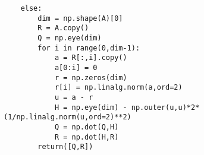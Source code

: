 \documentclass[10pt,a4paper]{article}
\begin{document}
\begin{verbatim}
    else:                                                                                                                                                                                  
        dim = np.shape(A)[0]                                                                                                                                                               
        R = A.copy()                                                                                                                                                                       
        Q = np.eye(dim)                                                                                                                                                                    
        for i in range(0,dim-1):                                                                                                                                                           
            a = R[:,i].copy()                                                                                                                                                              
            a[0:i] = 0                                                                                                                                                                     
            r = np.zeros(dim)                                                                                                                                                              
            r[i] = np.linalg.norm(a,ord=2)                                                                                                                                                 
            u = a - r                                                                                                                                                                      
            H = np.eye(dim) - np.outer(u,u)*2*(1/np.linalg.norm(u,ord=2)**2)                                                                                                               
            Q = np.dot(Q,H)                                                                                                                                                                
            R = np.dot(H,R)                                                                                                                                                                
        return([Q,R])                                                                                                                                                                      
                                                                                                                                                                                           

\end{verbatim}
\end{document}
